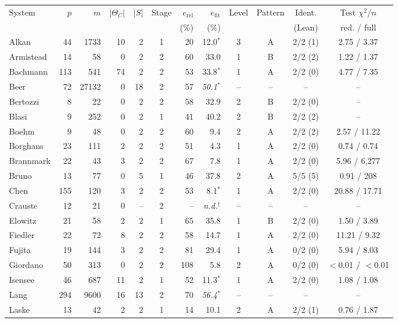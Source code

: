 \begin{tabular}{@{}lrrrrcrrcccc@{}}
\toprule
System & $p$ & $m$ & $|\Theta_C|$ & $|S|$ & Stage & $e_{\mathrm{rel}}$ & $e_{\mathrm{fit}}$ & Level & Pattern & Ident. & Test $\chi^2/n$ \\
 & & & & & & (\%) & (\%) & & & (Lean) & red. / full \\
\midrule
Alkan & 44 & 1733 & 10 & 2 & 1 & 20 & 12.0$^{\ast}$ & 3 & A & 2/2 (1) & 2.75 / 3.37 \\
Armistead & 14 & 58 & 0 & 2 & 2 & 60 & 33.0 & 1 & B & 2/2 (2) & 1.22 / 1.37 \\
Bachmann & 113 & 541 & 74 & 2 & 2 & 53 & 33.8$^{\ast}$ & 1 & A & 2/2 (0) & 4.77 / 7.35 \\
Beer & 72 & 27132 & 0 & 18 & 2 & 57 & \textit{50.1$^{\ast}$} & -- & -- & -- & -- \\
Bertozzi & 8 & 22 & 0 & 2 & 2 & 58 & 32.9 & 2 & B & 2/2 (0) & -- \\
Blasi & 9 & 252 & 0 & 2 & 1 & 41 & 40.2 & 2 & B & 2/2 (2) & -- \\
Boehm & 9 & 48 & 0 & 2 & 2 & 60 & 9.4 & 2 & A & 2/2 (2) & 2.57 / 11.22 \\
Borghans & 23 & 111 & 2 & 2 & 2 & 51 & 4.3 & 1 & A & 2/2 (0) & 0.74 / 0.74 \\
Brannmark & 22 & 43 & 3 & 2 & 2 & 67 & 7.8 & 1 & A & 2/2 (0) & 5.96 / 6{,}277 \\
Bruno & 13 & 77 & 0 & 5 & 1 & 46 & 37.8 & 2 & A & 5/5 (5) & 0.91 / 208 \\
Chen & 155 & 120 & 3 & 2 & 2 & 53 & 8.1$^{\ast}$ & 1 & A & 2/2 (0) & 20.88 / 17.71 \\
Crauste & 12 & 21 & 0 & -- & 2 & -- & \textit{n.d.}$^{\dagger}$ & -- & -- & -- & -- \\
Elowitz & 21 & 58 & 2 & 2 & 1 & 65 & 35.8 & 1 & B & 2/2 (0) & 1.50 / 3.89 \\
Fiedler & 22 & 72 & 8 & 2 & 2 & 58 & 14.7 & 1 & A & 2/2 (0) & 11.21 / 9.32 \\
Fujita & 19 & 144 & 3 & 2 & 2 & 81 & 29.4 & 1 & A & 0/2 (0) & 5.94 / 8.03 \\
Giordano & 50 & 313 & 0 & 2 & 2 & 108 & 5.8 & 2 & A & 0/2 (0) & $<$0.01 / $<$0.01 \\
Isensee & 46 & 687 & 11 & 2 & 1 & 52 & 11.3$^{\ast}$ & 1 & A & 2/2 (0) & 1.08 / 1.08 \\
Lang & 294 & 9600 & 16 & 13 & 2 & 70 & \textit{56.4$^{\ast}$} & -- & -- & -- & -- \\
Laske & 13 & 42 & 2 & 2 & 1 & 14 & 10.1 & 2 & A & 2/2 (1) & 0.76 / 1.87 \\

\end{tabular}
